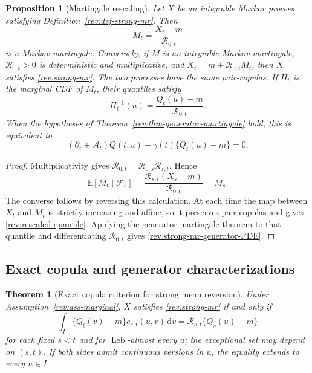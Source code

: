 \documentclass[11pt]{article}
\newtheorem{theorem}[definition]{Theorem}
\newtheorem{proposition}[definition]{Proposition}
\theoremstyle{remark}
\newcommand{\E}{\mathbb E}
\newcommand{\dd}{\,\mathrm d}
\newcommand{\Leb}{\operatorname{Leb}}
\begin{document}
\begin{proposition}[Martingale rescaling]
\label{rev:prop-martingale-rescaling}
Let $X$ be an integrable Markov process satisfying
Definition~\ref{rev:def-strong-mr}.  Then
\begin{equation}
M_t=\frac{X_t-m}{\mathcal R_{0,t}}
\label{rev:martingale-rescaling}
\end{equation}
is a Markov martingale.  Conversely, if $M$ is an integrable Markov martingale,
$\mathcal R_{0,t}>0$ is deterministic and multiplicative, and
$X_t=m+\mathcal R_{0,t}M_t$, then $X$ satisfies
\eqref{rev:strong-mr}.  The two processes have the same pair-copulas.  If
$H_t$ is the marginal CDF of $M_t$, their quantiles satisfy
\begin{equation}
H_t^{-1}(u)=\frac{Q_t(u)-m}{\mathcal R_{0,t}}.
\label{rev:rescaled-quantile}
\end{equation}
When the hypotheses of Theorem~\ref{rev:thm-generator-martingale} hold, this is
equivalent to
\begin{equation}
(\partial_t+\mathcal A_t)Q(t,u)
-\gamma(t)\{Q_t(u)-m\}=0.
\label{rev:strong-mr-generator-PDE}
\end{equation}
\end{proposition}

\begin{proof}
Multiplicativity gives
$\mathcal R_{0,t}=\mathcal R_{0,s}\mathcal R_{s,t}$.  Hence
\[
\E[M_t\mid\mathcal F_s]
=\frac{\mathcal R_{s,t}(X_s-m)}{\mathcal R_{0,t}}
=M_s.
\]
The converse follows by reversing this calculation.  At each time the map
between $X_t$ and $M_t$ is strictly increasing and affine, so it preserves
pair-copulas and gives \eqref{rev:rescaled-quantile}.  Applying the generator
martingale theorem to that quantile and differentiating
$\mathcal R_{0,t}$ gives \eqref{rev:strong-mr-generator-PDE}.
\end{proof}

\subsection{Exact copula and generator characterizations}

\begin{theorem}[Exact copula criterion for strong mean reversion]
\label{rev:thm-exact-mr}
Under Assumption~\ref{rev:ass-marginal}, $X$ satisfies
\eqref{rev:strong-mr} if and only if
\begin{equation}
\int_I\{Q_t(v)-m\}c_{s,t}(u,v)\dd v
=\mathcal R_{s,t}\{Q_s(u)-m\}
\label{rev:exact-mr-copula}
\end{equation}
for each fixed $s<t$ and for $\Leb$-almost every $u$; the exceptional set may
depend on $(s,t)$.  If both sides admit continuous versions in $u$, the equality
extends to every $u\in I$.
\end{theorem}
\end{document}

